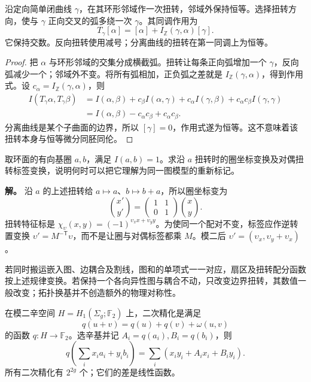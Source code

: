 \begin{proposition}
沿定向简单闭曲线 $\gamma$，在其环形邻域作一次扭转，邻域外保持恒等。选择扭转方向，使与 $\gamma$ 正向交叉的弧多绕一次 $\gamma$。其同调作用为
\begin{equation}
 T_\gamma[\alpha]=[\alpha]+I_{\mathbb Z}(\gamma,\alpha)[\gamma].
 \label{eq:phys-sm-dehn-transvection}
\end{equation}
它保持交数。反向扭转使用减号；分离曲线的扭转在第一同调上为恒等。
\end{proposition}
\begin{proof}
把 $\alpha$ 与环形邻域的交集分成横截弧。扭转让每条正向弧增加一个 $\gamma$，反向弧减少一个；邻域外不变。将所有弧相加，正负弧之差就是 $I_{\mathbb Z}(\gamma,\alpha)$，得到作用式。设 $c_\alpha=I_{\mathbb Z}(\gamma,\alpha)$，则
\begin{align*}
 I(T_\gamma\alpha,T_\gamma\beta)
 &=I(\alpha,\beta)+c_\beta I(\alpha,\gamma)
   +c_\alpha I(\gamma,\beta)+c_\alpha c_\beta I(\gamma,\gamma)\\
 &=I(\alpha,\beta)-c_\alpha c_\beta+c_\alpha c_\beta.
\end{align*}
分离曲线是某个子曲面的边界，所以 $[\gamma]=0$，作用式遂为恒等。这不意味着该扭转本身与恒等微分同胚同伦。
\end{proof}

\begin{workedexample}[环面圈与扭转标签的变换]
取环面的有向基圈 $a,b$，满足 $I(a,b)=1$。求沿 $a$ 扭转时的圈坐标变换及对偶扭转标签变换，说明何时可以把它理解为同一图模型的重新标记。

\textbf{解。} 沿 $a$ 的上述扭转给 $a\mapsto a$、$b\mapsto b+a$，所以圈坐标变为
\[
 \binom{x'}{y'}=\begin{pmatrix}1&1\\0&1\end{pmatrix}\binom{x}{y}.
\]
扭转特征标是 $\chi_\upsilon(x,y)=(-1)^{\upsilon_xx+\upsilon_yy}$。为使同一个配对不变，标签应作逆转置变换 $\upsilon'=M^{-\mathsf T}\upsilon$，而不是让圈与对偶标签都乘 $M$。模二后 $\upsilon'=(\upsilon_x,\upsilon_y+\upsilon_x)$。

若同时搬运嵌入图、边耦合及割线，图和的单项式一一对应，扇区及扭转配分函数按上述规律变换。若保持一个各向异性图与耦合不动，只改变边界扭转，其数值一般改变；拓扑换基并不创造额外的物理对称性。
\end{workedexample}

\begin{definition}
在模二辛空间 $H=H_1(\Sigma_g;\mathbb F_2)$ 上，二次精化是满足
\[
 q(u+v)=q(u)+q(v)+\omega(u,v)
\]
的函数 $q:H\to\mathbb F_2$。选辛基并记 $A_i=q(a_i),B_i=q(b_i)$，则
\[
 q\!\left(\sum_i x_ia_i+y_ib_i\right)
 =\sum_i(x_iy_i+A_ix_i+B_iy_i).
\]
所有二次精化有 $2^{2g}$ 个；它们的差是线性函数。
\end{definition}

